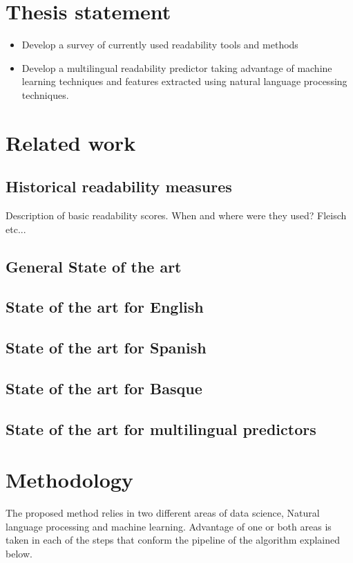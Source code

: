 \documentclass[12pt]{article}
\begin{document}
\section{Thesis statement}
\begin{itemize}
\item Develop a survey of currently used readability tools and methods
\item Develop a multilingual readability predictor taking advantage of machine learning techniques and features extracted using natural language processing techniques.
\end{itemize}

\section{Related work}
\subsection{Historical readability measures}
Description of basic readability scores. When and where were they used? Fleisch etc...
\subsection{General State of the art}

\subsection{State of the art for English}
\subsection{State of the art for Spanish}
\subsection{State of the art for Basque}

\subsection{State of the art for multilingual predictors}

\section{Methodology}
The proposed method relies in two different areas of data science, Natural language processing and machine learning. Advantage of one or both areas is taken in each of the steps that conform the pipeline of the algorithm explained below.
\end{document}
